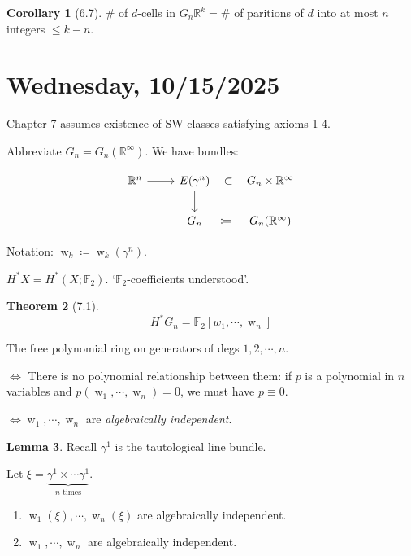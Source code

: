 \documentclass{article}
\theoremstyle{definition}
\newtheorem{theorem}{Theorem}
\newtheorem{lemma}[theorem]{Lemma}
\newtheorem{corollary}[theorem]{Corollary}
\begin{document}
    \begin{corollary}
        [6.7] \(\#\) of \(d\)-cells in \(G_n\mathbb{R}^k = \#\) of paritions of \(d\) into at most \(n\) integers \(\leq k - n\).
    \end{corollary}

    \section*{Wednesday, 10/15/2025}
    
    Chapter 7 assumes existence of SW classes satisfying axioms 1-4.

    Abbreviate \(G_n = G_n(\mathbb{R}^{\infty})\). We have bundles:

    \[
        \begin{tikzcd}
            \mathbb{R}^n \ar[r] & E(\gamma^n) \ar[d] \ar[r,"\subset", phantom] & G_n \times \mathbb{R}^{\infty} \\ & G_n \ar[r,"\coloneqq", phantom] & G_n(\mathbb{R}^{\infty})
        \end{tikzcd}
    \]

    Notation: \(\operatorname{w}_k \coloneqq \operatorname{w}_k(\gamma^n)\).

    \(H^{\ast} X = H^{\ast} (X;\mathbb{F}_2)\). `\(\mathbb{F}_2\)-coefficients understood'.

    \begin{theorem}
        [7.1]

        \[
            H^{\ast} G_n = \mathbb{F}_2[w_1, \cdots , \operatorname{w}_n]
        \]
    \end{theorem}
    
    
    The free polynomial ring on generators of degs \(1, 2, \cdots , n\).

    \(\iff\) There is no polynomial relationship between them: if \(p\) is a polynomial in \(n\) variables and \(p(\operatorname{w}_1, \cdots , \operatorname{w}_n) = 0\), we must have \(p \equiv 0\).
        
    \(\iff \operatorname{w}_1, \cdots , \operatorname{w}_n\) are \textit{algebraically independent}.
    
    \begin{lemma}
        Recall \(\gamma^1\) is the tautological line bundle.

        Let \(\xi = \underbrace{\gamma^1 \times \cdots \gamma^1}_{n \text{ times}}\).

        \begin{enumerate}[label=\roman*)]
            \item \(\operatorname{w}_1(\xi), \cdots , \operatorname{w}_n(\xi)\) are algebraically independent.
            \item \(\operatorname{w}_1, \cdots , \operatorname{w}_n\) are algebraically independent.  
        \end{enumerate} 
    \end{lemma}
\end{document}
